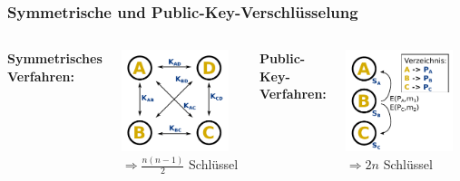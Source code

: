 \documentclass{beamer}
\begin{document}
\begin{frame}
\frametitle{Symmetrische und Public-Key-Verschlüsselung}
\begin{columns}

	\textbf{Symmetrisches Verfahren:}
	
	\includegraphics[width=0.9\textwidth]{images/symmetric.pdf}\\

	\(\Rightarrow \frac{n(n-1)}{2}\) Schlüssel

\pause
{}
	\textbf{Public-Key-Verfahren:}

	\includegraphics[width=0.9\textwidth]{images/asymmetric2.pdf}\\

	\(\Rightarrow 2n\) Schlüssel

\end{columns}
\end{frame}
\end{document}
